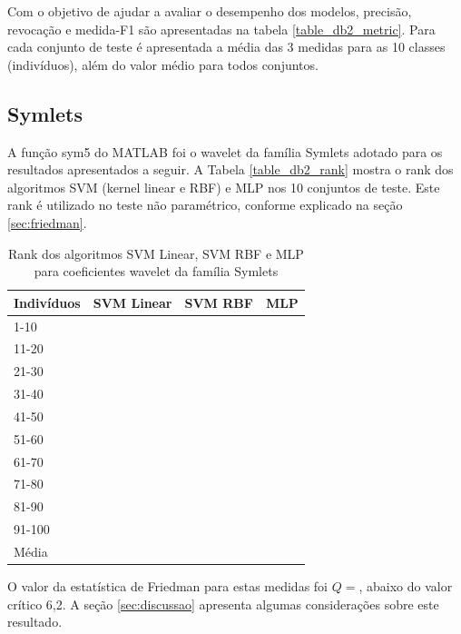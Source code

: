 \documentclass[conference]{IEEEtran}
\begin{document}
Com o objetivo de ajudar a avaliar o desempenho dos modelos, precisão, revocação e medida-F1 são apresentadas na tabela \ref{table_db2_metric}. Para cada conjunto de teste é apresentada a média das 3 medidas para as 10 classes (indivíduos), além do valor médio para todos conjuntos.

\newpage
\subsection{Symlets}
A função sym5 do MATLAB foi o wavelet da família Symlets adotado para os resultados apresentados a seguir. A Tabela \ref{table_db2_rank} mostra o rank dos algoritmos SVM (kernel linear e RBF) e MLP nos 10 conjuntos de teste. Este rank é utilizado no teste não paramétrico, conforme explicado na seção \ref{sec:friedman}.

\begin{table}[!t]
\caption{Rank dos algoritmos SVM Linear, SVM RBF e MLP para coeficientes wavelet da família Symlets}
\label{table_sym5_rank}
\centering
\begin{tabular}{lccc}
\hline
Indivíduos & SVM Linear & SVM RBF & MLP \\
\hline
1-10   &  &  &  \\
11-20  &  &  &  \\
21-30  &  &  &  \\
31-40  &  &  &  \\
41-50  &  &  &  \\
51-60  &  &  &  \\
61-70  &  &  &  \\
71-80  &  &  &  \\
81-90  &  &  &  \\
91-100 &  &  &  \\ \hline
Média  &  &  &  \\
\end{tabular}
\end{table}

O valor da estatística de Friedman para estas medidas foi $Q = $, abaixo do valor crítico 6,2. A seção \ref{sec:discussao} apresenta algumas considerações sobre este resultado.
\end{document}
